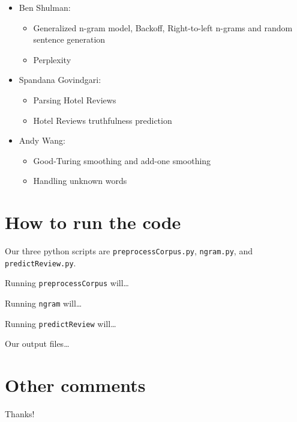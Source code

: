 \documentclass{article}
\begin{document}
\begin{itemize}[noitemsep]
\item Ben Shulman:
  \begin{itemize}[noitemsep,nolistsep]
  \item Generalized n-gram model, Backoff, Right-to-left n-grams and random sentence generation
  \item Perplexity
  \end{itemize}
\item Spandana Govindgari:
  \begin{itemize}[noitemsep,nolistsep]
  \item Parsing Hotel Reviews
  \item Hotel Reviews truthfulness prediction
  \end{itemize}
\item Andy Wang:
  \begin{itemize}[noitemsep,nolistsep]
  \item Good-Turing smoothing and add-one smoothing
  \item Handling unknown words
  \end{itemize}
\end{itemize}

\section{How to run the code} %
Our three python scripts are \texttt{preprocessCorpus.py}, \texttt{ngram.py}, and \texttt{predictReview.py}.\par
Running \texttt{preprocessCorpus} will\ldots\par
Running \texttt{ngram} will\ldots\par
Running \texttt{predictReview} will\ldots\par

Our output files\ldots

\section{Other comments}
Thanks!
\end{document}
